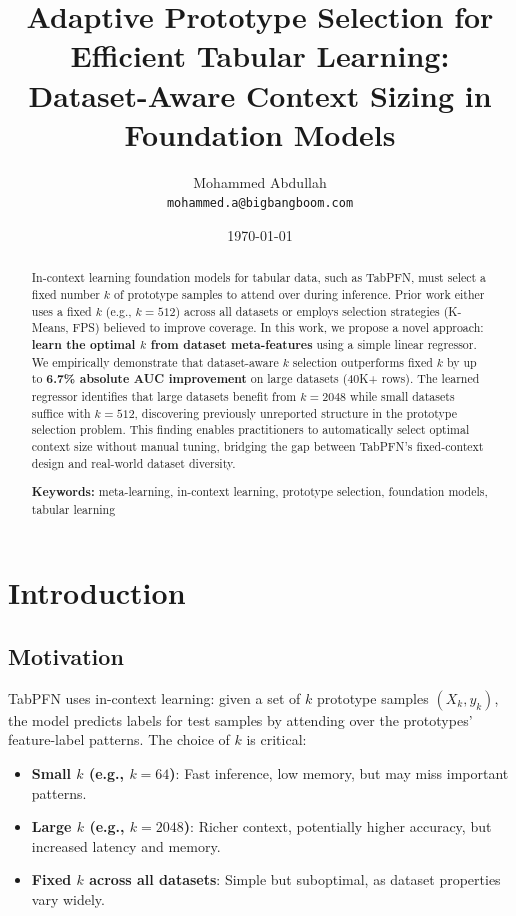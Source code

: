 \documentclass[11pt,a4paper]{article}
\title{Adaptive Prototype Selection for Efficient Tabular Learning: Dataset-Aware Context Sizing in Foundation Models}
\author{
  Mohammed Abdullah\\
  \texttt{mohammed.a@bigbangboom.com}
}
\date{\today}
\begin{document}
\maketitle

\begin{abstract}
In-context learning foundation models for tabular data, such as TabPFN, must select a fixed number $k$ of prototype samples to attend over during inference. Prior work either uses a fixed $k$ (e.g., $k=512$) across all datasets or employs selection strategies (K-Means, FPS) believed to improve coverage. In this work, we propose a novel approach: \textbf{learn the optimal $k$ from dataset meta-features} using a simple linear regressor. We empirically demonstrate that dataset-aware $k$ selection outperforms fixed $k$ by up to \textbf{6.7\% absolute AUC improvement} on large datasets (40K+ rows). The learned regressor identifies that large datasets benefit from $k=2048$ while small datasets suffice with $k=512$, discovering previously unreported structure in the prototype selection problem. This finding enables practitioners to automatically select optimal context size without manual tuning, bridging the gap between TabPFN's fixed-context design and real-world dataset diversity.

\textbf{Keywords:} meta-learning, in-context learning, prototype selection, foundation models, tabular learning
\end{abstract}

\section{Introduction}

\subsection{Motivation}

TabPFN uses in-context learning: given a set of $k$ prototype samples $(X_k, y_k)$, the model predicts labels for test samples by attending over the prototypes' feature-label patterns. The choice of $k$ is critical:

\begin{itemize}
\item \textbf{Small $k$ (e.g., $k=64$)}: Fast inference, low memory, but may miss important patterns.
\item \textbf{Large $k$ (e.g., $k=2048$)}: Richer context, potentially higher accuracy, but increased latency and memory.
\item \textbf{Fixed $k$ across all datasets}: Simple but suboptimal, as dataset properties vary widely.
\end{itemize}
\end{document}
